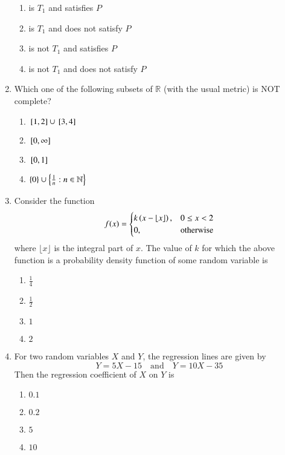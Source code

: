 \documentclass[journal,12pt,onecolumn]{IEEEtran}
\theoremstyle{remark}
\begin{document}
\begin{enumerate}
\begin{enumerate}[label=(\Alph*)]
\item is $T_1$ and satisfies $P$
\item is $T_1$ and does not satisfy $P$
\item is not $T_1$ and satisfies $P$
\item is not $T_1$ and does not satisfy $P$
\end{enumerate}

\item Which one of the following subsets of $\mathbb{R}$ (with the usual metric) is NOT complete?  
\\[-0.3em]\makebox[\textwidth][r]{\textit{[GATE EE 2025]}}

\begin{enumerate}[label=(\Alph*)]
\item ${}\left[1,2\right] \cup {}\left[3,4\right]$
\item ${}\left[0,\infty\right]$
\item ${}\left[0,1\right]$
\item $\{0\} \cup \left\{\frac{1}{n} : n \in \mathbb{N}\right\}$
\end{enumerate}

\item Consider the function  
\[
f(x) =
\begin{cases}
k\left(x - \lfloor x \rfloor\right), & 0 \le x < 2 \\
0, & \text{otherwise}
\end{cases}
\]
where $\lfloor x \rfloor$ is the integral part of $x$.  
The value of $k$ for which the above function is a probability density function of some random variable is  
\\[-0.3em]\makebox[\textwidth][r]{\textit{[GATE EE 2025]}}

\begin{enumerate}[label=(\Alph*)]
\item $\frac14$
\item $\frac12$
\item $1$
\item $2$
\end{enumerate}

\item For two random variables $X$ and $Y$, the regression lines are given by  
\[
Y = 5X - 15 \quad \text{and} \quad Y = 10X - 35
\]
Then the regression coefficient of $X$ on $Y$ is  
\\[-0.3em]\makebox[\textwidth][r]{\textit{[GATE EE 2025]}}

\begin{enumerate}[label=(\Alph*)]
\item $0.1$
\item $0.2$
\item $5$
\item $10$
\end{enumerate}


\end{enumerate}
\end{document}
